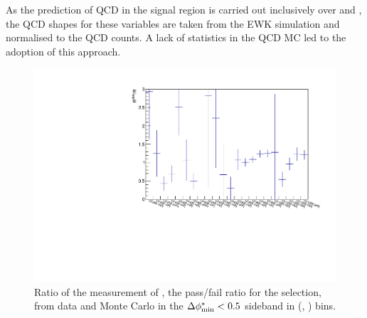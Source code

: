 As the prediction of QCD in the signal region is carried out
inclusively over \nb and \mht, the QCD shapes for these variables are
taken from the EWK simulation and normalised to the QCD counts. 
A lack of statistics in
the QCD MC led to the adoption of this approach. 
%
\begin{figure}[h!]
  \begin{center}        
    \includegraphics[width=\textwidth]{figures/qcd/qcdANPlots/doubleQcdSbSrRatio1D}
    \caption{ Ratio of the measurement of \rmhtmet, the pass/fail
      ratio for the \mhtmet selection, from data and Monte Carlo in
      the $\mbox{$\Delta\phi^{*}_{\rm min}$} < 0.5$ sideband in (\scalht, \njet) bins.   
    }
    \label{fig:RR_qcd}
  \end{center} 
\end{figure}

